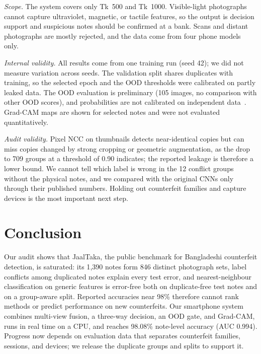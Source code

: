 \documentclass[pdflatex,sn-mathphys-num]{sn-jnl}
\begin{document}
\emph{Scope.} The system covers only Tk~500 and Tk~1000. Visible-light photographs
cannot capture ultraviolet, magnetic, or tactile features, so the output is decision
support and suspicious notes should be confirmed at a bank. Scans and distant
photographs are mostly rejected, and the data come from four phone models only.

\emph{Internal validity.} All results come from one training run (seed 42); we did not
measure variation across seeds. The validation split shares duplicates with training,
so the selected epoch and the OOD thresholds were calibrated on partly leaked data. The
OOD evaluation is preliminary (105 images, no comparison with other OOD scores), and
probabilities are not calibrated on independent data~\cite{guo2017calibration}.
Grad-CAM maps are shown for selected notes and were not evaluated quantitatively.

\emph{Audit validity.} Pixel NCC on thumbnails detects near-identical copies but can
miss copies changed by strong cropping or geometric augmentation, as the drop to 709
groups at a threshold of 0.90 indicates; the reported leakage is therefore a lower bound.
We cannot tell which label is wrong in the 12 conflict groups without the physical
notes, and we compared with the original CNNs only through their published numbers.
Holding out counterfeit families and capture devices is the most important next step.

\section{Conclusion}\label{sec:conclusion}

Our audit shows that JaalTaka, the public benchmark for Bangladeshi counterfeit
detection, is saturated: its 1{,}390 notes form 846 distinct photograph sets, label
conflicts among duplicated notes explain every test error, and nearest-neighbour
classification on generic features is error-free both on duplicate-free test notes and
on a group-aware split. Reported accuracies near 98\% therefore cannot rank methods or
predict performance on new counterfeits. Our smartphone system combines multi-view
fusion, a three-way decision, an OOD gate, and Grad-CAM, runs in real time on a CPU, and
reaches 98.08\% note-level accuracy (AUC 0.994). Progress now depends on evaluation data
that separates counterfeit families, sessions, and devices; we release the duplicate
groups and splits to support it.
\end{document}
